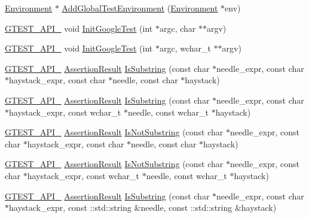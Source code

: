 \begin{DoxyCompactItemize}
\item 
\hyperlink{classtesting_1_1_environment}{Environment} $\ast$ \hyperlink{namespacetesting_a460d7b998622e332392c1e00be3a60d5}{Add\+Global\+Test\+Environment} (\hyperlink{classtesting_1_1_environment}{Environment} $\ast$env)
\item 
\hyperlink{gtest-port_8h_aa73be6f0ba4a7456180a94904ce17790}{G\+T\+E\+S\+T\+\_\+\+A\+P\+I\+\_\+} void \hyperlink{namespacetesting_afd726ae08c9bd16dc52f78c822d9946b}{Init\+Google\+Test} (int $\ast$argc, char $\ast$$\ast$argv)
\item 
\hyperlink{gtest-port_8h_aa73be6f0ba4a7456180a94904ce17790}{G\+T\+E\+S\+T\+\_\+\+A\+P\+I\+\_\+} void \hyperlink{namespacetesting_ae5a88709a4a7529e30c83242156556b3}{Init\+Google\+Test} (int $\ast$argc, wchar\+\_\+t $\ast$$\ast$argv)
\item 
\hyperlink{gtest-port_8h_aa73be6f0ba4a7456180a94904ce17790}{G\+T\+E\+S\+T\+\_\+\+A\+P\+I\+\_\+} \hyperlink{classtesting_1_1_assertion_result}{Assertion\+Result} \hyperlink{namespacetesting_a390c4f66fe7e9098117eb77e5fffa4ad}{Is\+Substring} (const char $\ast$needle\+\_\+expr, const char $\ast$haystack\+\_\+expr, const char $\ast$needle, const char $\ast$haystack)
\item 
\hyperlink{gtest-port_8h_aa73be6f0ba4a7456180a94904ce17790}{G\+T\+E\+S\+T\+\_\+\+A\+P\+I\+\_\+} \hyperlink{classtesting_1_1_assertion_result}{Assertion\+Result} \hyperlink{namespacetesting_aa1c82529c7591d2a9fd016de45dd9113}{Is\+Substring} (const char $\ast$needle\+\_\+expr, const char $\ast$haystack\+\_\+expr, const wchar\+\_\+t $\ast$needle, const wchar\+\_\+t $\ast$haystack)
\item 
\hyperlink{gtest-port_8h_aa73be6f0ba4a7456180a94904ce17790}{G\+T\+E\+S\+T\+\_\+\+A\+P\+I\+\_\+} \hyperlink{classtesting_1_1_assertion_result}{Assertion\+Result} \hyperlink{namespacetesting_a2288dcf4249f88af67dcd46544dc49a6}{Is\+Not\+Substring} (const char $\ast$needle\+\_\+expr, const char $\ast$haystack\+\_\+expr, const char $\ast$needle, const char $\ast$haystack)
\item 
\hyperlink{gtest-port_8h_aa73be6f0ba4a7456180a94904ce17790}{G\+T\+E\+S\+T\+\_\+\+A\+P\+I\+\_\+} \hyperlink{classtesting_1_1_assertion_result}{Assertion\+Result} \hyperlink{namespacetesting_a53e5c6e91ea429c43de7f4f57e33d166}{Is\+Not\+Substring} (const char $\ast$needle\+\_\+expr, const char $\ast$haystack\+\_\+expr, const wchar\+\_\+t $\ast$needle, const wchar\+\_\+t $\ast$haystack)
\item 
\hyperlink{gtest-port_8h_aa73be6f0ba4a7456180a94904ce17790}{G\+T\+E\+S\+T\+\_\+\+A\+P\+I\+\_\+} \hyperlink{classtesting_1_1_assertion_result}{Assertion\+Result} \hyperlink{namespacetesting_a571c7edcfc574269833ebe3e7d338ec5}{Is\+Substring} (const char $\ast$needle\+\_\+expr, const char $\ast$haystack\+\_\+expr, const \+::std\+::string \&needle, const \+::std\+::string \&haystack)

\end{DoxyCompactItemize}
